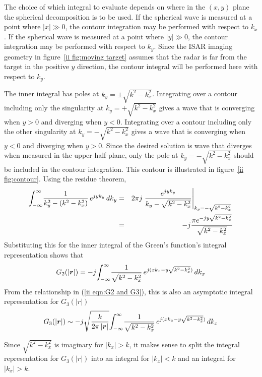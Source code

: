 The choice of which integral to evaluate depends on where in the $(x,y)$
plane the spherical decomposition is to be used.  If the spherical wave is
measured at a point where $\left|x\right|\gg 0$, the contour integration may
be performed with respect to $k_x$.  If the spherical wave is measured at a
point where $\left|y\right|\gg 0$, the contour integration may be performed
with respect to $k_y$.  Since the ISAR imaging geometry in figure~\ref{ii
fig:moving target} assumes that the radar is far from the target in the
positive $y$ direction, the contour integral will be performed here with
respect to $k_y$.

The inner integral has poles at $k_y=\pm\sqrt{k^2-k_x^2}$.  Integrating over
a contour including only the singularity at $k_y=+\sqrt{k^2-k_x^2}$ gives a
wave that is converging when $y>0$ and diverging when $y<0$. Integrating
over a contour including only the other singularity at
$k_y=-\sqrt{k^2-k_x^2}$ gives a wave that is converging when $y<0$ and
diverging when $y>0$.  Since the desired solution is wave that diverges when
measured in the upper half-plane, only the pole at $k_y=-\sqrt{k^2-k_x^2}$
should be included in the contour integration.  This contour is illustrated
in figure~\ref{ii fig:contour}.  Using the residue theorem,
\begin{eqnarray}
{\int_{-\infty}^{\infty}}\frac{1}{k_y^2-(k^2-k_x^2)}\,e^{jyk_y}\,dk_y
&=&2\pi j \left. \frac{\displaystyle e^{jyk_y}}{k_y-\sqrt{k^2-k_x^2}}
	\right|_{k_y=-\sqrt{k^2-k_x^2}}{\nonumber}\\
&=&-j\frac{\displaystyle \pi e^{-jy\sqrt{k^2-k_x^2}}}{\sqrt{k^2-k_x^2}}
\label{ii eqn:contour int}
\end{eqnarray}
Substituting this for the inner integral of the Green's function's integral
representation shows that
\begin{equation}
G_2(\left|\bm{r}\right|)
=-j{\int_{-\infty}^{\infty}} \frac{1}{\sqrt{k^2-k_x^2}}\,e^{j(xk_x-y\sqrt{k^2-k_x^2})}\,dk_x
\end{equation}
From the relationship in (\ref{ii eqn:G2 and G3}), this is also an
asymptotic integral representation for $G_3(\left|r\right|)$  
\begin{equation}
G_3(\left|\bm{r}\right|)\sim -j\sqrt{\frac{k}{2\pi\left|\bm{r}\right|}}
{\int_{-\infty}^{\infty}} \frac{1}{\sqrt{k^2-k_x^2}}\,e^{j(xk_x-y\sqrt{k^2-k_x^2})}\,dk_x
\end{equation}

Since $\sqrt{k^2-k_x^2}$ is imaginary for $\left|k_x\right|>k$, it makes
sense to split the integral representation for $G_3(\left|r\right|)$ into an
integral for $\left|k_x\right|<k$ and an integral for $\left|k_x\right|>k$.

